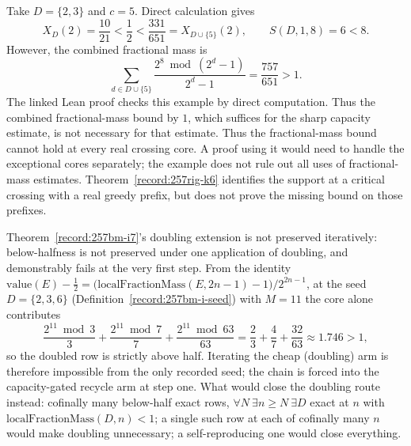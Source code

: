 \begin{prop}\label{record:257bm-k2}
Take $D=\{2,3\}$ and $c=5$.  Direct calculation gives
\[
 X_D(2)=\frac{10}{21}<\frac12
 <\frac{331}{651}=X_{D\cup\{5\}}(2),\qquad S(D,1,8)=6<8.
\]
However, the combined fractional mass is
\[
 \sum_{d\in D\cup\{5\}}\frac{2^8\bmod(2^d-1)}{2^d-1}
 =\frac{757}{651}>1.
\]
The linked Lean proof checks this example by direct computation.  Thus the
combined fractional-mass bound by $1$, which suffices for the sharp
capacity estimate, is not necessary for that estimate.
Thus the fractional-mass bound cannot hold at every real crossing core.
A proof using it would need to handle the exceptional cores separately;
the example does not rule out all uses of fractional-mass estimates.
Theorem~\ref{record:257rig-k6} identifies the support at a critical
crossing with a real greedy prefix, but does not prove the missing bound
on those prefixes.
\end{prop}

\begin{obs}\label{record:257bm-k3}
Theorem~\ref{record:257bm-i7}'s doubling extension is not preserved iteratively: below-halfness is not preserved
under one application of doubling, and demonstrably fails at the very first step. From the
identity $\mathrm{value}(E)-\tfrac12 = \big(\mathrm{localFractionMass}(E,2n{-}1)-1\big)/2^{2n-1}$,
at the seed $D=\{2,3,6\}$ (Definition~\ref{record:257bm-i-seed}) with $M=11$ the core alone contributes
\[
\frac{2^{11}\bmod3}{3} + \frac{2^{11}\bmod7}{7} + \frac{2^{11}\bmod63}{63} = \frac23+\frac47+\frac{32}{63} \approx 1.746 > 1,
\]
so the doubled row is strictly above half. Iterating the cheap (doubling) arm is therefore
impossible from the only recorded seed; the chain is forced into the capacity-gated recycle arm
at step one. What would close the doubling route instead: cofinally many below-half exact rows,
$\forall N\ \exists n\ge N\ \exists D$ exact at $n$ with $\mathrm{localFractionMass}(D,n)<1$; a
single such row at each of cofinally many $n$ would make doubling unnecessary; a
self-reproducing one would close everything.
\par\noindent   {}
\end{obs}

